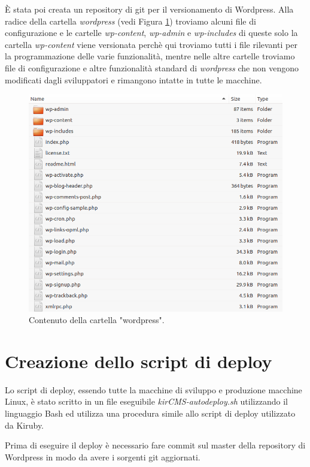 È stata poi creata un repository di git per il versionamento di Wordpress. 
Alla radice della cartella \emph{wordpress} (vedi Figura \ref{fig:wptree}) troviamo alcuni file di configurazione e le cartelle \emph{wp-content}, \emph{wp-admin} e \emph{wp-includes}\cite{WPDIR} di queste solo la
cartella \emph{wp-content} viene versionata perchè qui troviamo tutti i file rilevanti per la programmazione delle varie funzionalità, mentre nelle
altre cartelle troviamo file di configurazione e altre funzionalità standard di \emph{wordpress} che non vengono modificati dagli sviluppatori
e rimangono intatte in tutte le macchine.

\begin{figure}
  \includegraphics[width=\textwidth]{figure/wpfolder.png}
  \caption{Contenuto della cartella "wordpress".}
  \label{fig:wptree}
\end{figure}

\section{Creazione dello script di deploy}
Lo script di deploy, essendo tutte la macchine di sviluppo e produzione macchine Linux, è stato scritto in un file eseguibile
\emph{kirCMS-autodeploy.sh} utilizzando il linguaggio Bash ed utilizza una procedura simile allo script di deploy 
utilizzato da Kiruby.

Prima di eseguire il deploy è necessario fare commit sul master della repository di Wordpress in modo da avere i sorgenti git aggiornati.

